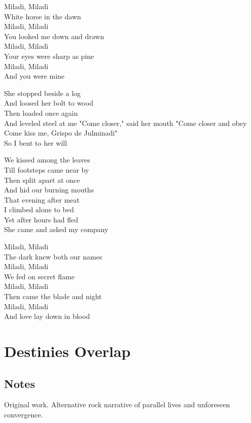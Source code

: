 \begin{lyrics}
Miladi, Miladi\\
White horse in the dawn\\
Miladi, Miladi\\
You looked me down and drawn\\
Miladi, Miladi\\
Your eyes were sharp as pine\\
Miladi, Miladi\\
And you were mine

She stopped beside a log\\
And loosed her bolt to wood\\
Then loaded once again\\
And leveled steel at me
"Come closer," said her mouth
"Come closer and obey\\
Come kiss me, Grispo de Julminadi"\\
So I bent to her will

We kissed among the leaves\\
Till footsteps came near by\\
Then split apart at once\\
And hid our burning mouths\\
That evening after meat\\
I climbed alone to bed\\
Yet after hours had fled\\
She came and asked my company

Miladi, Miladi\\
The dark knew both our names\\
Miladi, Miladi\\
We fed on secret flame\\
Miladi, Miladi\\
Then came the blade and night\\
Miladi, Miladi\\
And love lay down in blood
\end{lyrics}

\section{Destinies Overlap}

\subsection{Notes}
Original work.
Alternative rock narrative of parallel lives and unforeseen convergence.

